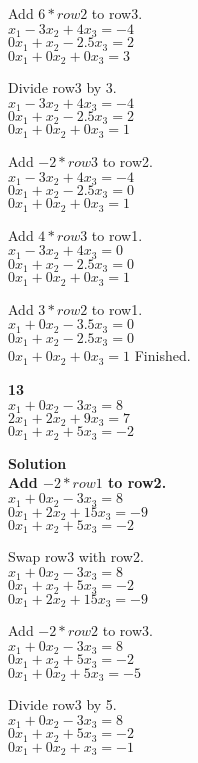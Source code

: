 \documentclass{article}
\begin{document}
Add $6*row2$ to row3.\\
$x_{1} - 3x_{2} + 4x_{3} = -4$\\
$0x_{1} + x_{2} - 2.5x_{3} = 2$\\
$0x_{1} + 0x_{2} + 0x_{3} = 3$

Divide row3 by 3.\\
$x_{1} - 3x_{2} + 4x_{3} = -4$\\
$0x_{1} + x_{2} - 2.5x_{3} = 2$\\
$0x_{1} + 0x_{2} + 0x_{3} = 1$

Add $-2*row3$ to row2.\\
$x_{1} - 3x_{2} + 4x_{3} = -4$\\
$0x_{1} + x_{2} - 2.5x_{3} = 0$\\
$0x_{1} + 0x_{2} + 0x_{3} = 1$

Add $4*row3$ to row1.\\
$x_{1} - 3x_{2} + 4x_{3} = 0$\\
$0x_{1} + x_{2} - 2.5x_{3} = 0$\\
$0x_{1} + 0x_{2} + 0x_{3} = 1$

Add $3*row2$ to row1.\\
$x_{1} + 0x_{2} - 3.5x_{3} = 0$\\
$0x_{1} + x_{2} - 2.5x_{3} = 0$\\
$0x_{1} + 0x_{2} + 0x_{3} = 1$
Finished.

\bf{13}\\
$x_{1} + 0x_{2} - 3x_{3} = 8$\\
$2x_{1} + 2x_{2} + 9x_{3} = 7$\\
$0x_{1} + x_{2} + 5x_{3} = -2$

\bf{Solution}\\
Add $-2*row1$ to row2.\\
$x_{1} + 0x_{2} - 3x_{3} = 8$\\
$0x_{1} + 2x_{2} + 15x_{3} = -9$\\
$0x_{1} + x_{2} + 5x_{3} = -2$

Swap row3 with row2.\\
$x_{1} + 0x_{2} - 3x_{3} = 8$\\
$0x_{1} + x_{2} + 5x_{3} = -2$\\
$0x_{1} + 2x_{2} + 15x_{3} = -9$

Add $-2*row2$ to row3.\\
$x_{1} + 0x_{2} - 3x_{3} = 8$\\
$0x_{1} + x_{2} + 5x_{3} = -2$\\
$0x_{1} + 0x_{2} + 5x_{3} = -5$

Divide row3 by 5.\\
$x_{1} + 0x_{2} - 3x_{3} = 8$\\
$0x_{1} + x_{2} + 5x_{3} = -2$\\
$0x_{1} + 0x_{2} + x_{3} = -1$
\end{document}
